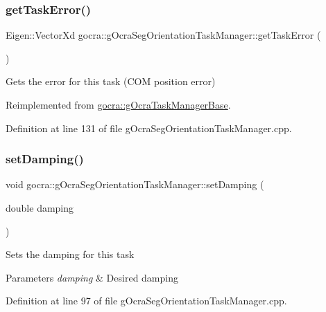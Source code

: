 \subsubsection{\texorpdfstring{get\+Task\+Error()}{getTaskError()}}
{\footnotesize\ttfamily Eigen\+::\+Vector\+Xd gocra\+::g\+Ocra\+Seg\+Orientation\+Task\+Manager\+::get\+Task\+Error (\begin{DoxyParamCaption}{ }\end{DoxyParamCaption})\hspace{0.3cm}{\ttfamily [virtual]}}

Gets the error for this task (C\+OM position error) 

Reimplemented from \hyperlink{classgocra_1_1gOcraTaskManagerBase_a5c40a14b3a1d5a6519da422310d28f97}{gocra\+::g\+Ocra\+Task\+Manager\+Base}.



Definition at line 131 of file g\+Ocra\+Seg\+Orientation\+Task\+Manager.\+cpp.

\hypertarget{classgocra_1_1gOcraSegOrientationTaskManager_acca4be597440e5da0e3ded3d78116c18}{}\label{classgocra_1_1gOcraSegOrientationTaskManager_acca4be597440e5da0e3ded3d78116c18} 
\subsubsection{\texorpdfstring{set\+Damping()}{setDamping()}}
{\footnotesize\ttfamily void gocra\+::g\+Ocra\+Seg\+Orientation\+Task\+Manager\+::set\+Damping (\begin{DoxyParamCaption}\item[{double}]{damping }\end{DoxyParamCaption})}

Sets the damping for this task


\begin{DoxyParams}{Parameters}
{\em damping} & Desired damping \\
\hline
\end{DoxyParams}


Definition at line 97 of file g\+Ocra\+Seg\+Orientation\+Task\+Manager.\+cpp.

\hypertarget{classgocra_1_1gOcraSegOrientationTaskManager_a3e0d8d41f14d2368777b5b84e0ef5d4f}{}\label{classgocra_1_1gOcraSegOrientationTaskManager_a3e0d8d41f14d2368777b5b84e0ef5d4f} 
